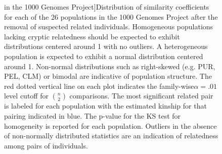\begin{figure}
in the 1000 Genomes Project]{Distribution of similarity coefficients for each of the 26 populations
in the 1000 Genomes Project after the removal of suspected related
individuals. Homogeneous populations lacking cryptic relatedness should
be expected to exhibit distributions centered around 1 with no outliers.
A heterogeneous population is expected to exhibit a normal distribution
centered around 1. Non-normal distributions such as right-skewed (e.g.
PUR, PEL, CLM) or bimodal are indicative of population structure.
The red dotted vertical line on each plot indicates the family-wise$\alpha=.01$
level cutoff for ${n \choose 2}$ comparisons. The most significant
related pair is labeled for each population with the estimated kinship
for that pairing indicated in blue. The p-value for the KS test for
homogeneity is reported for each population. Outliers in the absence
of non-normally distributed statistics are an indication of relatedness
among pairs of individuals.}
\label{All s plots-1}
\end{figure}

